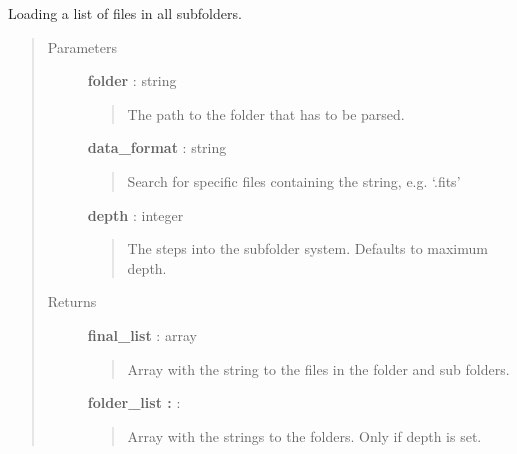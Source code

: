 \documentclass[a4paper,10pt,english]{sphinxmanual}
\begin{document}
\begin{fulllineitems}
\label{maps:astrolyze.maps.tools.get_list}
Loading a list of files in all subfolders.
\begin{quote}\begin{description}
\item[{Parameters }] \leavevmode
\textbf{folder} : string
\begin{quote}

The path to the folder that has to be parsed.
\end{quote}

\textbf{data\_format} : string
\begin{quote}

Search for specific files containing the string, e.g.
`.fits'
\end{quote}

\textbf{depth} : integer
\begin{quote}

The steps into the subfolder system. Defaults to maximum depth.
\end{quote}

\item[{Returns }] \leavevmode
\textbf{final\_list} : array
\begin{quote}

Array with the string to the files in the folder and sub folders.
\end{quote}

\textbf{folder\_list :} :
\begin{quote}

Array with the strings to the folders. Only if depth is set.
\end{quote}

\end{description}\end{quote}

\end{fulllineitems}

\end{document}
